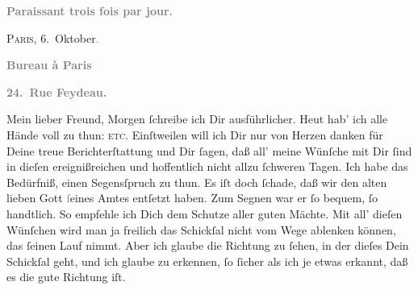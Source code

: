 \pstart
           \begin{otherlanguage}{french}\textcolor{gray}{\textbf{\textbf{Paraissant trois fois par jour.}}}\end{otherlanguage}\hfill \textsc{Paris}, 6. Oktober\textcolor{gray}{.}\pend
           
\pstart
           \begin{otherlanguage}{french}\textcolor{gray}{\textbf{\textbf{Bureau à Paris}}}\end{otherlanguage}\pend
           
\pstart
           \begin{otherlanguage}{french}\textcolor{gray}{\textbf{\textbf{24. Rue Feydeau.}}}\end{otherlanguage}\pend
           
\pstart\center{}Mein lieber Freund,\pend\vspace{0.5em}
\pstart
           Morgen{ }ſchreibe ich Dir ausführlicher. Heut hab’ ich alle Hände voll zu thun: \label{K_L02749-1v}\label{K_L02749-1}{ }\textsc{etc}. Einſtweilen will ich Dir nur von Herzen danken für
               Deine treue Berichterſtattung und Dir{ }ſagen, daß 
               all’ meine Wünſche mit Dir{ }ſind in dieſen {\pb}ereignißreichen und hoffentlich nicht allzu{ }ſchweren Tagen. Ich habe das Bedürfniß,
               einen Segensſpruch zu thun. Es iſt doch{ }ſchade, daß \strikeout{\textcolor{gray}{n}} wir den alten lieben Gott \textcolor{gray}{ſ}eines  Amtes entſetzt haben. Zum Segnen war er{ }ſo bequem,{ }ſo handtlich. So
               empfehle ich Dich dem Schutze aller guten Mächte. Mit all’ dieſen Wünſchen wird man
               ja freilich {\pb}das Schickſal nicht vom Wege ablenken
               können, das{ }ſeinen Lauf nimmt. Aber ich glaube die Richtung zu{ }ſehen, in der dieſes
               Dein Schickſal geht, und ich glaube zu erkennen,{ }ſo{ }ſicher als ich je etwas erkannt,
               daß es die gute Richtung iſt.\pend
           
